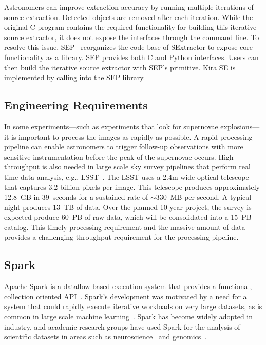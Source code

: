 \documentclass[conference]{IEEEtran}
\begin{document}
Astronomers can improve extraction accuracy by running multiple iterations of source
extraction. Detected objects are removed after each iteration. While
the original C program contains the required functionality for building this iterative source extractor,
it does not expose the interfaces through the command line. To resolve this issue,
SEP~\cite{barbary2015} reorganizes the code base of SExtractor to expose core
functionality as a library. SEP provides both C and Python interfaces. Users can then
build the iterative source extractor with SEP's primitive. Kira SE is implemented by calling into
the SEP library.

\subsection{Engineering Requirements}
\label{sec:Background-EngReq}

In some experiments---such as experiments that look for supernovae explosions---it is important to process
the images as rapidly as possible. A rapid processing pipeline can enable astronomers to trigger follow-up
observations with more sensitive instrumentation before the peak of the supernovae occurs.
High throughput is also needed in large scale
sky survey pipelines that perform real time data analysis, e.g., LSST~\cite{ivezic08}.
The LSST uses a 2.4m-wide optical telescope that captures 3.2 billion pixels per
image. This telescope produces approximately 12.8~GB in 39~seconds
for a sustained rate of $\sim$330~MB per second. A typical night produces 13~TB of data. 
Over the planned 10-year project, the survey is expected produce 60~PB of raw data, which will be consolidated into a 15~PB catalog.
This timely processing requirement and the massive amount of data provides a challenging throughput requirement for the 
processing pipeline. 

\subsection{Spark}
Apache Spark is a dataflow-based execution system that provides a functional, collection
oriented API~\cite{zaharia12}. Spark's development was motivated by a need for a
system that could rapidly execute iterative workloads on very large datasets, as is common
in large scale machine learning~\cite{zaharia10}. Spark has
become widely adopted in industry, and academic research groups have used Spark
for the analysis of scientific datasets in areas such as neuroscience~\cite{freeman14} and genomics~\cite{nothaft15}.
\end{document}
